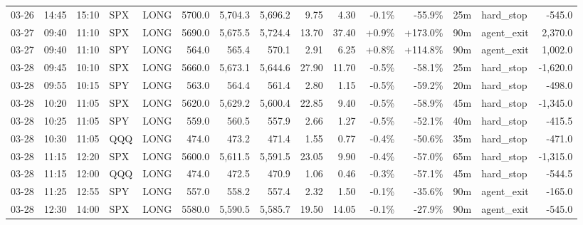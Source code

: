 \documentclass[11pt,a4paper,twoside]{article}
\begin{document}
\begin{landscape}
\begin{center}
\begin{longtable}{>{\color{txtmain}}l l l l l r r r r r r r r >{\color{txtmain}}l r}
03-26 & 14:45 & 15:10 & SPX & LONG & 5700.0 & 5,704.3 & 5,696.2 & 9.75 & 4.30 & \textcolor{lossred}{-0.1\%} & \textcolor{lossred}{-55.9\%} & 25m & hard\_stop & \textcolor{lossred}{-545.0} \\
03-27 & 09:40 & 11:10 & SPX & LONG & 5690.0 & 5,675.5 & 5,724.4 & 13.70 & 37.40 & \textcolor{wingreen}{+0.9\%} & \textcolor{wingreen}{+173.0\%} & 90m & agent\_exit & \textcolor{wingreen}{2,370.0} \\
03-27 & 09:40 & 11:10 & SPY & LONG & 564.0 & 565.4 & 570.1 & 2.91 & 6.25 & \textcolor{wingreen}{+0.8\%} & \textcolor{wingreen}{+114.8\%} & 90m & agent\_exit & \textcolor{wingreen}{1,002.0} \\
03-28 & 09:45 & 10:10 & SPX & LONG & 5660.0 & 5,673.1 & 5,644.6 & 27.90 & 11.70 & \textcolor{lossred}{-0.5\%} & \textcolor{lossred}{-58.1\%} & 25m & hard\_stop & \textcolor{lossred}{-1,620.0} \\
03-28 & 09:55 & 10:15 & SPY & LONG & 563.0 & 564.4 & 561.4 & 2.80 & 1.15 & \textcolor{lossred}{-0.5\%} & \textcolor{lossred}{-59.2\%} & 20m & hard\_stop & \textcolor{lossred}{-498.0} \\
03-28 & 10:20 & 11:05 & SPX & LONG & 5620.0 & 5,629.2 & 5,600.4 & 22.85 & 9.40 & \textcolor{lossred}{-0.5\%} & \textcolor{lossred}{-58.9\%} & 45m & hard\_stop & \textcolor{lossred}{-1,345.0} \\
03-28 & 10:25 & 11:05 & SPY & LONG & 559.0 & 560.5 & 557.9 & 2.66 & 1.27 & \textcolor{lossred}{-0.5\%} & \textcolor{lossred}{-52.1\%} & 40m & hard\_stop & \textcolor{lossred}{-415.5} \\
03-28 & 10:30 & 11:05 & QQQ & LONG & 474.0 & 473.2 & 471.4 & 1.55 & 0.77 & \textcolor{lossred}{-0.4\%} & \textcolor{lossred}{-50.6\%} & 35m & hard\_stop & \textcolor{lossred}{-471.0} \\
03-28 & 11:15 & 12:20 & SPX & LONG & 5600.0 & 5,611.5 & 5,591.5 & 23.05 & 9.90 & \textcolor{lossred}{-0.4\%} & \textcolor{lossred}{-57.0\%} & 65m & hard\_stop & \textcolor{lossred}{-1,315.0} \\
03-28 & 11:15 & 12:00 & QQQ & LONG & 474.0 & 472.5 & 470.9 & 1.06 & 0.46 & \textcolor{lossred}{-0.3\%} & \textcolor{lossred}{-57.1\%} & 45m & hard\_stop & \textcolor{lossred}{-544.5} \\
03-28 & 11:25 & 12:55 & SPY & LONG & 557.0 & 558.2 & 557.4 & 2.32 & 1.50 & \textcolor{lossred}{-0.1\%} & \textcolor{lossred}{-35.6\%} & 90m & agent\_exit & \textcolor{lossred}{-165.0} \\
03-28 & 12:30 & 14:00 & SPX & LONG & 5580.0 & 5,590.5 & 5,585.7 & 19.50 & 14.05 & \textcolor{lossred}{-0.1\%} & \textcolor{lossred}{-27.9\%} & 90m & agent\_exit & \textcolor{lossred}{-545.0} \\

\end{longtable}
\end{center}
\end{landscape}
\end{document}
